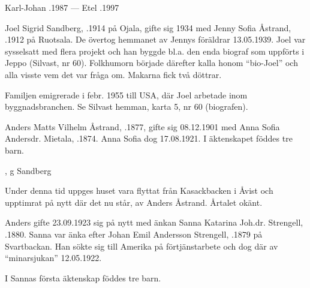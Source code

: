 Karl-Johan .1987  ---  Etel .1997


Joel Sigrid Sandberg, .1914 på Ojala, gifte sig 1934 med Jenny Sofia Åstrand, .1912 på Ruotsala. De övertog hemmanet av Jennys föräldrar 13.05.1939. Joel var sysselsatt med flera projekt och han byggde bl.a. den enda biograf som uppförts i Jeppo (Silvast, nr 60). Folkhumorn började därefter kalla honom ``bio-Joel'' och alla visste vem det var fråga om. Makarna fick två döttrar.
\begin{jhchildren}
  \item {}
  \item {}
\end{jhchildren}

Familjen emigrerade i febr. 1955 till USA, där Joel arbetade inom byggnadsbranchen. Se Silvast hemman, karta 5, nr 60 (biografen).


Anders Matts Vilhelm Åstrand, .1877, gifte sig 08.12.1901 med Anna Sofia Andersdr. Mietala, .1874. Anna Sofia dog 17.08.1921. I äktenskapet föddes tre barn.
\begin{jhchildren}
  \item {}
  \item {}
  \item {}, g Sandberg
\end{jhchildren}
Under denna tid uppges huset vara flyttat från Kasackbacken i Åvist och upptimrat på nytt där det nu står, av Anders Åstrand. Årtalet okänt.

Anders gifte 23.09.1923 sig på nytt med änkan Sanna Katarina Joh.dr. Strengell, .1880. Sanna var änka efter Johan Emil Andersson Strengell, .1879 på Svartbackan. Han sökte sig till Amerika på förtjänstarbete och dog där av ``minarsjukan'' 12.05.1922.

I Sannas första äktenskap föddes tre barn.
\begin{jhchildren}
  \item {}
  \item {}
  \item {}
\end{jhchildren}



